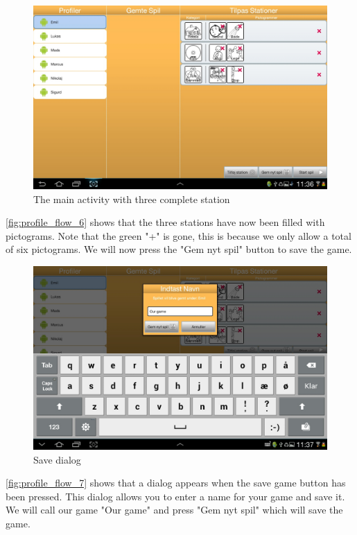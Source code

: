 \begin{figure}[H]
\centering
\includegraphics[width=1.0\linewidth]{img/screenshots/profile_flow_6.jpg}%
\caption{The main activity with three complete station}
\label{fig:profile_flow_6}
\end{figure}

\autoref{fig:profile_flow_6} shows that the three stations have now been filled with pictograms. Note that the green "+" is gone, this is because we only allow a total of six pictograms. We will now press the "Gem nyt spil" button to save the game.

\begin{figure}[H]
\centering
\includegraphics[width=1.0\linewidth]{img/screenshots/profile_flow_7.jpg}%
\caption{Save dialog}
\label{fig:profile_flow_7}
\end{figure}

\autoref{fig:profile_flow_7} shows that a dialog appears when the save game button has been pressed. This dialog allows you to enter a name for your game and save it. We will call our game "Our game" and press "Gem nyt spil" which will save the game.

